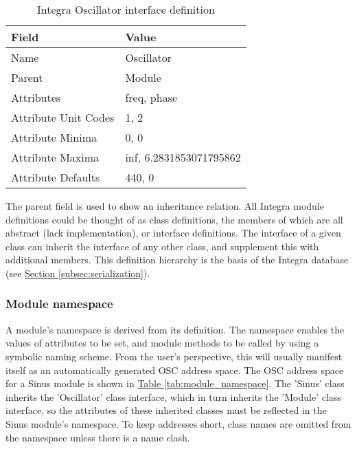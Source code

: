 \begin{table}
\begin{center}
\begin{tabular}{|l|l|}
\hline
\textbf{Field} & \textbf{Value} \\
\hline
Name  & Oscillator \\
\hline
Parent  & Module \\
\hline
Attributes & freq, phase \\
\hline
Attribute Unit Codes & 1, 2 \\
\hline
Attribute Minima & 0, 0 \\
\hline
Attribute Maxima & inf, 6.2831853071795862 \\
\hline
Attribute Defaults & 440, 0 \\
\hline
\end{tabular} 
\end{center}
\caption{Integra Oscillator interface definition}
\label{tab:module_definition}
\end{table}

The parent field is used to show an inheritance relation. All Integra module definitions could be thought of as class definitions, the members of which are all abstract (lack implementation), or interface definitions. The interface of a given class can inherit the interface of any other class, and supplement this with additional members. This definition hierarchy is the basis of the Integra database (see \hyperref[subsec:serialization]{Section \ref*{subsec:serialization}}). 

\subsubsection{Module namespace}\label{subsubsec:module_namespace}

A module's namespace is derived from its definition. The namespace
enables the values of attributes to be set, and module methods to be
called by using a symbolic naming scheme.  From the user's
perspective, this will usually manifest itself as an automatically
generated OSC address space. The OSC address space for a Sinus module
is shown in \hyperref[tab:module_namespace]{Table \ref*{tab:module_namespace}}. The 'Sinus' class
inherits the 'Oscillator' class interface, which in turn inherits the
'Module' class interface, so the attributes of these inherited classes
must be reflected in the Sinus module's namespace. To keep addresses
short, class names are omitted from the namespace unless there is a
name clash.

